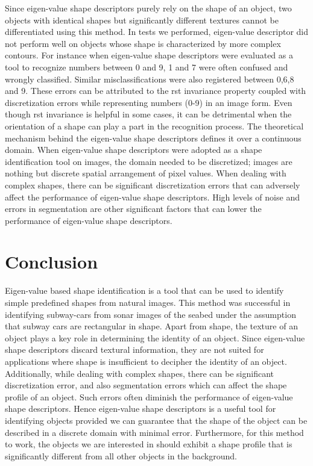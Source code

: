 \documentclass {udthesis}
\begin{document}
Since eigen-value shape descriptors purely rely on the shape of an object, two objects with identical shapes but significantly different textures cannot be differentiated using this method. In tests we performed, eigen-value descriptor did not perform well on objects whose shape is characterized by more complex contours. For instance when eigen-value shape descriptors were evaluated as a tool to recognize numbers between 0 and 9, 1 and 7 were often confused and wrongly classified. Similar misclassifications were also registered between 0,6,8 and 9. These errors can be attributed to the \gls{rst} invariance property coupled with discretization errors while representing numbers (0-9) in an image form. Even though \gls{rst} invariance is helpful in some cases, it can be detrimental when the orientation of a shape can play a part in the recognition process. The theoretical mechanism behind the eigen-value shape descriptors defines it over a continuous domain. When eigen-value shape descriptors were adopted as a 
shape 
identification tool on images, the domain needed to be discretized; images are nothing but discrete spatial arrangement of pixel values. When dealing with complex shapes, there can be significant discretization errors that can adversely affect the performance of eigen-value shape descriptors. High levels of noise and errors in segmentation are other significant factors that can lower the performance of eigen-value shape descriptors.


\section{Conclusion}

Eigen-value based shape identification is a tool that can be used to identify simple predefined shapes from natural images. This method was successful in identifying subway-cars from sonar images of the seabed under the assumption that subway cars are rectangular in shape. Apart from shape, the texture of an object plays a key role in determining the identity of an object. Since eigen-value shape descriptors discard textural information, they are not suited for applications where shape is insufficient to decipher the identity of an object. Additionally, while dealing with complex shapes, there can be significant discretization error, and also segmentation errors which can affect the shape profile of an object. Such errors often diminish the performance of eigen-value shape descriptors. Hence eigen-value shape descriptors is a useful tool for identifying objects provided we can guarantee that the shape of the object can be described in a discrete domain with minimal error. Furthermore, for this method to work,
 the 
objects we are interested in should exhibit a shape profile that is significantly different from all other objects in the background. 
\end{document}
